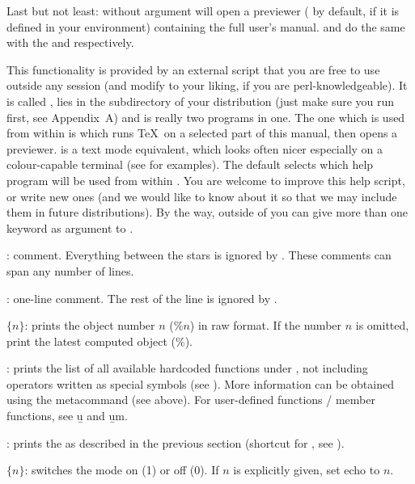 Last but not least:  without argument will open a 
previewer ( by default,  if it is defined in your
environment) containing the full user's manual.  and
 do the same with the  and 
respectively.

 This functionality is provided by an
external  script that you are free to use outside any  session
(and modify to your liking, if you are perl-knowledgeable). It is called
, lies in the  subdirectory of your distribution
(just make sure you run  first, see Appendix~A) and is
really two programs in one. The one which is used from within  is
 which runs \TeX\ on a selected part of this manual, then opens
a previewer.  is a text mode equivalent, which looks
often nicer especially on a colour-capable terminal (see
 for examples). The default  selects which
help program will be used from within . You are welcome to improve this
help script, or write new ones (and we would like to know about it
so that we may include them in future distributions). By the way, outside
of  you can give more than one keyword as argument to .

: comment. Everything between the stars is ignored by
. These comments can span any number of lines.

\subseckbd{\bs\bs}: one-line comment. The rest of the line
is ignored by .

 $\{n\}$: prints the object number $n$ ($\%n$)
in raw format. If the number $n$ is omitted, print the latest computed object
($\%$). \label{se:history}

: prints the list of all available
hardcoded functions under , not including operators written as special
symbols (see ). More information can be obtained using
the  metacommand (see above). For user-defined functions / member
functions, see \b{u} and \b{um}.

: prints the  as described in the
previous section (shortcut for , see ).

 $\{n\}$: switches the  mode on (1) or off (0). If
$n$ is explicitly given, set echo to $n$.


